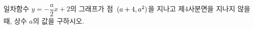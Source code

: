일차함수 $y=-\dfrac{a}{2}x+2$의 그래프가 점~$(a+4{,}\mkern3mu\mathopen{}a^2)$을 지나고 제$4$사분면을 지나지 않을 때, 상수 $a$의 값을 구하시오.
